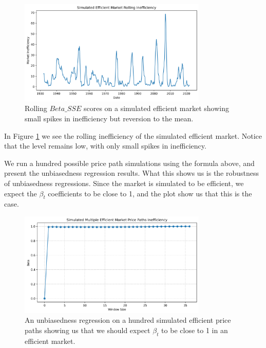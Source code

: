 \begin{figure}[h!]
    \centering
    \includegraphics[width=0.8\textwidth]{../figs/Simulated_Efficient_Market_Rolling_Inefficiency.png}
    \caption{Rolling $Beta\_SSE$ scores on a simulated efficient market showing small spikes in inefficiency but reversion to the mean.}
    \label{fig:efficient_market}
\end{figure}

In Figure \ref{fig:efficient_market} we see the rolling inefficiency of the simulated efficient market.
Notice that the level remains low, with only small spikes in inefficiency.

We run a hundred possible price path simulations using the formula above, and present the unbiasedness regression results. 
What this shows us is the robustness of unbiasedness regressions. Since the market is simulated to be efficient, we expect the $\beta_t$ coefficients to be close to 1,
and the plot show us that this is the case.

\begin{figure}[h!]
    \centering
    \includegraphics[width=0.8\textwidth]{../figs/Simulated_Multiple_Efficient_Market_Price_Paths_Inefficiency.png}
    \caption{An unbiasedness regression on a hundred simulated efficient price paths showing us that we should expect $\beta_t$ to be close to 1 in an efficient market.}
    \label{fig:efficient_market_unbiasedness}
\end{figure}

